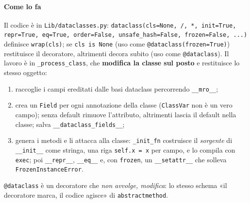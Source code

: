 \documentclass[a4paper,12pt]{article}
\begin{document}
\paragraph{Come lo fa} Il codice è in \texttt{Lib/dataclasses.py}: \texttt{dataclass(cls=None,
/, *, init=True, repr=True, eq=True, order=False, unsafe\_hash=False, frozen=False, ...)}
definisce \texttt{wrap(cls)}; se \texttt{cls is None} (uso come \texttt{@dataclass(frozen=True)})
restituisce il decoratore, altrimenti decora subito (uso come \texttt{@dataclass}). Il lavoro è
in \texttt{\_process\_class}, che \textbf{modifica la classe sul posto} e restituisce lo stesso
oggetto:
\begin{enumerate}[nosep]
  \item raccoglie i campi ereditati dalle basi dataclass percorrendo \texttt{\_\_mro\_\_};
  \item crea un \texttt{Field} per ogni annotazione della classe (\texttt{ClassVar} non è un
        vero campo); senza default rimuove l'attributo, altrimenti lascia il default nella
        classe; salva \texttt{\_\_dataclass\_fields\_\_};
  \item genera i metodi e li attacca alla classe: \texttt{\_init\_fn} costruisce il
        \emph{sorgente} di \texttt{\_\_init\_\_} come stringa, una riga
        \texttt{self.x = x} per campo, e lo compila con \texttt{exec}; poi \texttt{\_\_repr\_\_},
        \texttt{\_\_eq\_\_} e, con \texttt{frozen}, un \texttt{\_\_setattr\_\_} che solleva
        \texttt{FrozenInstanceError}.
\end{enumerate}
\texttt{@dataclass} è un decoratore che \emph{non avvolge, modifica}: lo stesso schema «il
decoratore marca, il codice agisce» di \texttt{abstractmethod}.
\end{document}
